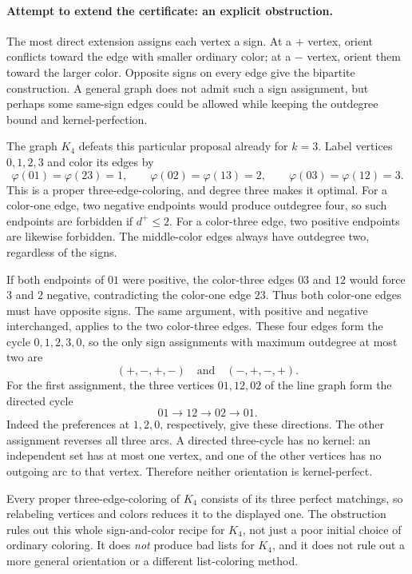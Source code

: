 \documentclass[11pt]{article}
\begin{document}
\paragraph{Attempt to extend the certificate: an explicit obstruction.}
The most direct extension assigns each vertex a sign. At a $+$ vertex,
orient conflicts toward the edge with smaller ordinary color; at a $-$
vertex, orient them toward the larger color. Opposite signs on every
edge give the bipartite construction. A general graph does not admit
such a sign assignment, but perhaps some same-sign edges could be allowed
while keeping the outdegree bound and kernel-perfection.

The graph $K_4$ defeats this particular proposal already for $k=3$.
Label vertices $0,1,2,3$ and color its edges by
\[
 \varphi(01)=\varphi(23)=1,\qquad
 \varphi(02)=\varphi(13)=2,\qquad
 \varphi(03)=\varphi(12)=3.
\]
This is a proper three-edge-coloring, and degree three makes it optimal.
For a color-one edge, two negative endpoints would produce outdegree
four, so such endpoints are forbidden if $d^+\leq2$. For a color-three
edge, two positive endpoints are likewise forbidden. The middle-color
edges always have outdegree two, regardless of the signs.

If both endpoints of $01$ were positive, the color-three edges $03$ and
$12$ would force $3$ and $2$ negative, contradicting the color-one edge
$23$. Thus both color-one edges must have opposite signs. The same
argument, with positive and negative interchanged, applies to the two
color-three edges. These four edges form the cycle $0,1,2,3,0$, so the
only sign assignments with maximum outdegree at most two are
\[
 (+,-,+,-)\quad\text{and}\quad(-,+,-,+).
\]
For the first assignment, the three vertices $01,12,02$ of the line graph
form the directed cycle
\[
 01\longrightarrow12\longrightarrow02\longrightarrow01.
\]
Indeed the preferences at $1,2,0$, respectively, give these directions.
The other assignment reverses all three arcs. A directed three-cycle has
no kernel: an independent set has at most one vertex, and one of the
other vertices has no outgoing arc to that vertex. Therefore neither
orientation is kernel-perfect.

Every proper three-edge-coloring of $K_4$ consists of its three perfect
matchings, so relabeling vertices and colors reduces it to the displayed
one. The obstruction rules out this whole sign-and-color recipe for
$K_4$, not just a poor initial choice of ordinary coloring. It does
\emph{not} produce bad lists for $K_4$, and it does not rule out a more
general orientation or a different list-coloring method.
\end{document}
